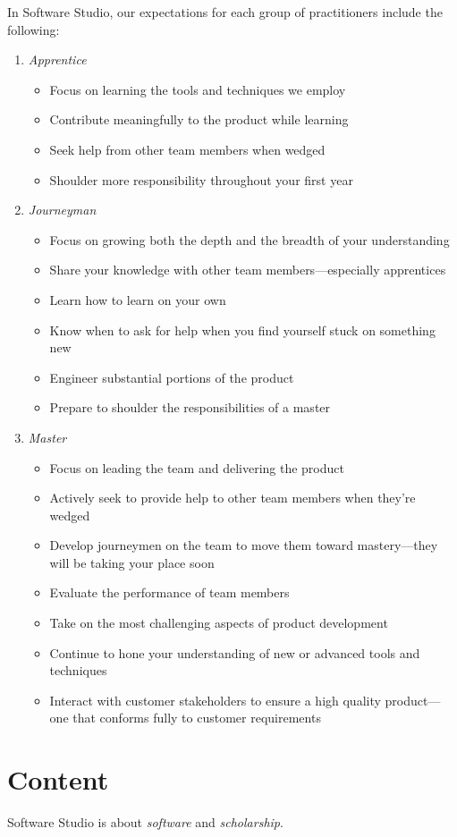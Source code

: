 \documentclass{article}
\begin{document}
In Software Studio, our expectations for each group of practitioners
include the following:
\begin{enumerate}
\item \emph{Apprentice}
\begin{itemize}
\item Focus on learning the tools and techniques we employ
\item Contribute meaningfully to the product while learning
\item Seek help from other team members when wedged
\item Shoulder more responsibility throughout your first year
\end{itemize}
\item \emph{Journeyman}
\begin{itemize}
\item Focus on growing both the depth and the breadth of your understanding
\item Share your knowledge with other team members---especially apprentices
\item Learn how to learn on your own
\item Know when to ask for help when you find yourself stuck on something new
\item Engineer substantial portions of the product
\item Prepare to shoulder the responsibilities of a master
\end{itemize}
\item \emph{Master}
\begin{itemize}
\item Focus on leading the team and delivering the product
\item Actively seek to provide help to other team members when they're wedged
\item Develop journeymen on the team to move them
toward mastery---they will be taking your place soon
\item Evaluate the performance of team members
\item Take on the most challenging aspects of product development
\item Continue to hone your understanding of new or advanced tools and techniques
\item Interact with customer stakeholders to ensure a high quality product---one that
conforms fully to customer requirements
\end{itemize}
\end{enumerate}
\section{Content}
\label{sec:orgheadline12}
Software Studio is about \emph{software} and \emph{scholarship}.
\end{document}
